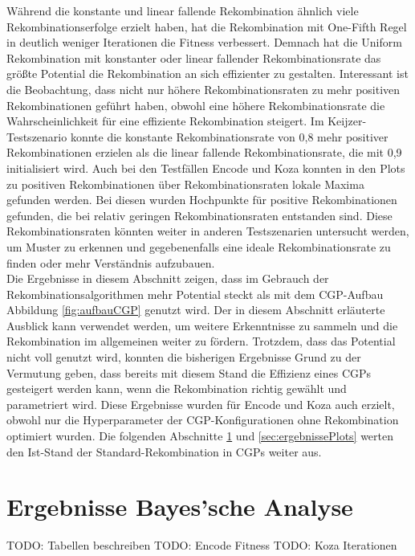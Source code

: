 Während die konstante und linear fallende Rekombination ähnlich viele Rekombinationserfolge erzielt haben, hat die Rekombination mit One-Fifth Regel in deutlich weniger Iterationen die Fitness verbessert.
Demnach hat die Uniform Rekombination mit konstanter oder linear fallender Rekombinationsrate das größte Potential die Rekombination an sich effizienter zu gestalten.
Interessant ist die Beobachtung, dass nicht nur höhere Rekombinationsraten zu mehr positiven Rekombinationen geführt haben, obwohl eine höhere Rekombinationsrate die Wahrscheinlichkeit für eine effiziente Rekombination steigert.
Im Keijzer-Testszenario konnte die konstante Rekombinationsrate von 0,8 mehr positiver Rekombinationen erzielen als die linear fallende Rekombinationsrate, die mit 0,9 initialisiert wird.
Auch bei den Testfällen Encode und Koza konnten in den Plots zu positiven Rekombinationen über Rekombinationsraten lokale Maxima gefunden werden.
Bei diesen wurden Hochpunkte für positive Rekombinationen gefunden, die bei relativ geringen Rekombinationsraten entstanden sind.
Diese Rekombinationsraten könnten weiter in anderen Testszenarien untersucht werden, um Muster zu erkennen und gegebenenfalls eine ideale Rekombinationsrate zu finden oder mehr Verständnis aufzubauen.\\
Die Ergebnisse in diesem Abschnitt zeigen, dass im Gebrauch der Rekombinationsalgorithmen mehr Potential steckt als mit dem CGP-Aufbau Abbildung \ref{fig:aufbauCGP} genutzt wird.
Der in diesem Abschnitt erläuterte Ausblick kann verwendet werden, um weitere Erkenntnisse zu sammeln und die Rekombination im allgemeinen weiter zu fördern.
Trotzdem, dass das Potential nicht voll genutzt wird, konnten die bisherigen Ergebnisse Grund zu der Vermutung geben, dass bereits mit diesem Stand die Effizienz eines CGPs gesteigert werden kann, wenn die Rekombination richtig gewählt und parametriert wird.
Diese Ergebnisse wurden für Encode und Koza auch erzielt, obwohl nur die Hyperparameter der CGP-Konfigurationen ohne Rekombination optimiert wurden.
Die folgenden Abschnitte \ref{sec:ergebnisseBayes} und \ref{sec:ergebnissePlots} werten den Ist-Stand der Standard-Rekombination in CGPs weiter aus.


\section{Ergebnisse Bayes'sche Analyse}
\label{sec:ergebnisseBayes}

TODO: Tabellen beschreiben
TODO: Encode Fitness
TODO: Koza Iterationen

